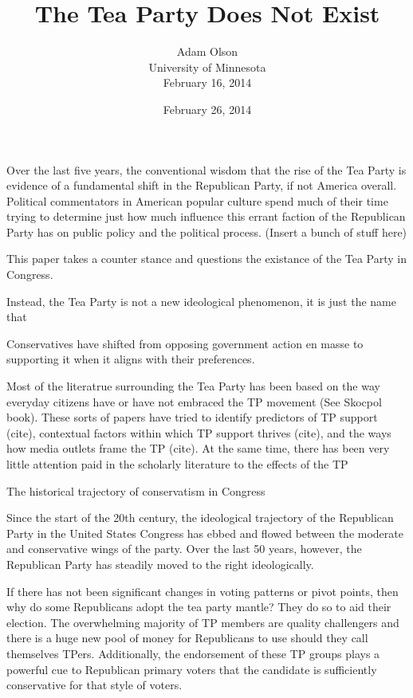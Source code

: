 \documentclass[12pt]{article}
\author{Adam Olson\\University of Minnesota\\February 16, 2014}
\title{The Tea Party Does Not Exist}
\date{February 26, 2014}
\makeatletter
\renewcommand{\maketitle}{\bgroup\setlength{\parindent}{0pt}
\begin{flushleft}
  \textbf{\@title}

  \@author
\end{flushleft}\egroup
}
\makeatother
\begin{document}
\maketitle

Over the last five years, the conventional wisdom that the rise of the Tea Party is evidence of a fundamental shift in the Republican Party, if not America overall. Political commentators in American popular culture spend much of their time trying to determine just how much influence this errant faction of the Republican Party has on public policy and the political process. (Insert a bunch of stuff here)

This paper takes a counter stance and questions the existance of the Tea Party in Congress. 

Instead, the Tea Party is not a new ideological phenomenon, it is just the name that 

Conservatives have shifted from opposing government action en masse to supporting it when it aligns with their preferences.

Most of the literatrue surrounding the Tea Party has been based on the way everyday citizens have or have not embraced the TP movement (See Skocpol book). These sorts of papers have tried to identify predictors of TP support (cite), contextual factors within which TP support thrives (cite), and the ways how media outlets frame the TP (cite). At the same time, there has been very little attention paid in the scholarly literature to the effects of the TP  


The historical trajectory of conservatism in Congress 

Since the start of the 20th century, the ideological trajectory of the Republican Party in the United States Congress has ebbed and flowed between the moderate and conservative wings of the party. Over the last 50 years, however, the Republican Party has steadily moved to the right ideologically.




If there has not been significant changes in voting patterns or pivot points, then why do some Republicans adopt the tea party mantle? They do so to aid their election. The overwhelming majority of TP members are quality challengers and there is a huge new pool of money for Republicans to use should they
call themselves TPers. Additionally, the endorsement of these TP groups plays a powerful cue to Republican primary voters that the candidate is sufficiently conservative for that style of voters.
\end{document}
